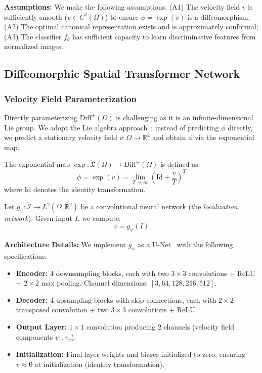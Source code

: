 \textbf{Assumptions:} We make the following assumptions: (A1) The velocity field $v$ is sufficiently smooth ($v \in C^2(\Omega)$) to ensure $\phi = \exp(v)$ is a diffeomorphism; (A2) The optimal canonical representation exists and is approximately conformal; (A3) The classifier $f_\theta$ has sufficient capacity to learn discriminative features from normalized images.

\subsection{Diffeomorphic Spatial Transformer Network}
\label{subsec:diffeomorphic}

\subsubsection{Velocity Field Parameterization}

Directly parameterizing $\text{Diff}^+(\Omega)$ is challenging as it is an infinite-dimensional Lie group. We adopt the Lie algebra approach~\cite{arsigny2006logdiff,voxelmorph}: instead of predicting $\phi$ directly, we predict a stationary velocity field $v: \Omega \rightarrow \mathbb{R}^2$ and obtain $\phi$ via the exponential map.

\begin{definition}
\label{def:exp_map}
The exponential map $\exp: \mathfrak{X}(\Omega) \rightarrow \text{Diff}^+(\Omega)$ is defined as:
\begin{equation}
\phi = \exp(v) = \lim_{T \rightarrow \infty} \left( \text{Id} + \frac{v}{T} \right)^T
\end{equation}
where $\text{Id}$ denotes the identity transformation.
\end{definition}

Let $g_\psi: \mathcal{I} \rightarrow L^2(\Omega, \mathbb{R}^2)$ be a convolutional neural network (the \textit{localization network}). Given input $I$, we compute:
\begin{equation}
v = g_\psi(I)
\end{equation}

\textbf{Architecture Details:} We implement $g_\psi$ as a U-Net~\cite{ronneberger2015unet} with the following specifications:
\begin{itemize}
    \item \textbf{Encoder:} 4 downsampling blocks, each with two $3 \times 3$ convolutions + ReLU + $2 \times 2$ max pooling. Channel dimensions: $[3, 64, 128, 256, 512]$.
    \item \textbf{Decoder:} 4 upsampling blocks with skip connections, each with $2 \times 2$ transposed convolution + two $3 \times 3$ convolutions + ReLU.
    \item \textbf{Output Layer:} $1 \times 1$ convolution producing 2 channels (velocity field components $v_x, v_y$).
    \item \textbf{Initialization:} Final layer weights and biases initialized to zero, ensuring $v \approx 0$ at initialization (identity transformation).
\end{itemize}

